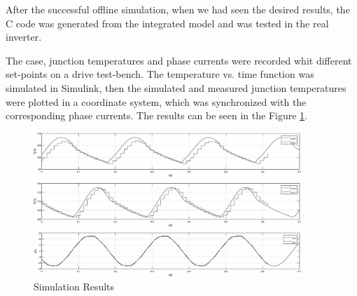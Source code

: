 After the successful offline simulation, when we had seen the desired results, the C code was generated from the integrated model and was tested in the real inverter.

The case, junction temperatures and phase currents were recorded whit different set-points on a drive test-bench. The temperature vs. time function was simulated in Simulink, then the simulated and measured junction temperatures were  plotted in a coordinate system, which was synchronized with the corresponding phase currents. The results can be seen in the Figure \ref{fig:fig_sim}.

\begin{figure}[!h]
\centering
\includegraphics[width=0.9\textwidth]{figures/homerseklet}
\caption{Simulation Results}
\label{fig:fig_sim}
\end{figure}


%

